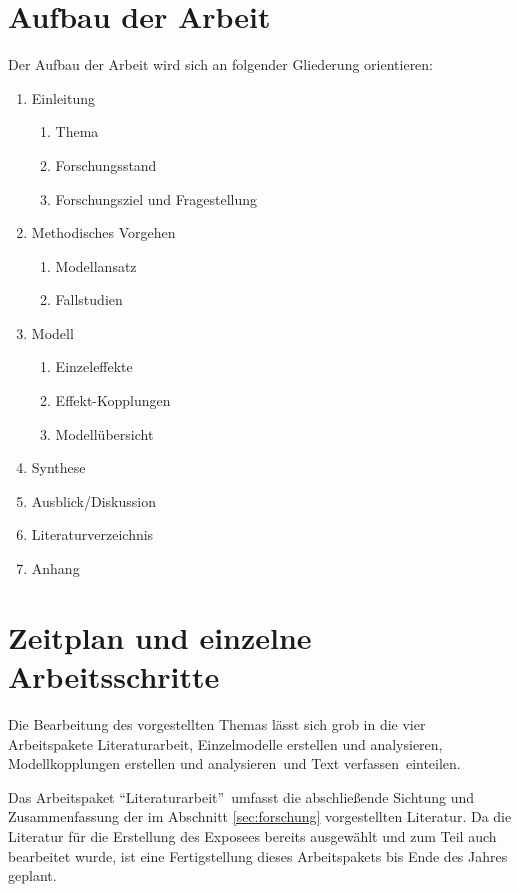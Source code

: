 \documentclass[11pt, titlepage=true]{scrartcl} %
\begin{document}
\newpage
\section{Aufbau der Arbeit}
Der Aufbau der Arbeit wird sich an folgender Gliederung orientieren:

\begin{enumerate}
\item Einleitung
	\begin{enumerate}
		\item Thema
		\item Forschungsstand
		\item Forschungsziel und Fragestellung
	\end{enumerate}
\item Methodisches Vorgehen
	\begin{enumerate}
		\item Modellansatz
		\item Fallstudien
	\end{enumerate}
\item Modell
	\begin{enumerate}
		\item Einzeleffekte
		\item Effekt-Kopplungen
		\item Modellübersicht
	\end{enumerate}

\item Synthese
\item Ausblick/Diskussion
\item Literaturverzeichnis
\item Anhang
\end{enumerate}

\section{Zeitplan und einzelne Arbeitsschritte}
\newcommand{\paketEins}{Literaturarbeit}
\newcommand{\paketZwei}{Einzelmodelle erstellen und analysieren}
\newcommand{\paketDrei}{Modellkopplungen erstellen und analysieren}
\newcommand{\paketVier}{Text verfassen}
Die Bearbeitung des vorgestellten Themas lässt sich grob in die vier
Arbeitspakete \paketEins, \paketZwei, \paketDrei\ und \paketVier\ einteilen. 

Das Arbeitspaket \enquote{\paketEins}\ umfasst die abschließende Sichtung und
Zusammenfassung der im Abschnitt \ref{sec:forschung} vorgestellten Literatur. Da
die Literatur für die Erstellung des Exposees bereits ausgewählt und zum Teil
auch bearbeitet wurde, ist eine Fertigstellung dieses Arbeitspakets bis Ende des
Jahres geplant.
\end{document}
